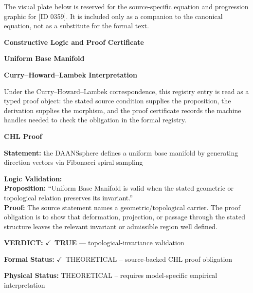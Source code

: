 \begingroup\footnotesize\sloppy
The visual plate below is reserved for the source-specific equation and progression graphic for [ID 0359]. It is included only as a companion to the canonical equation, not as a substitute for the formal text.
\par\endgroup
\ifTZPDarkEdition
{}
\fi

\clearpage
\begingroup\tzpsupportsetup
\noindent\textbf{\fontsize{10.8pt}{12.8pt}\selectfont [ID 0359] Constructive Logic and Proof Certificate}\par
\noindent\textbf{\fontsize{10pt}{12pt}\selectfont Uniform Base Manifold}\par
\vspace{0.45em}
\begingroup
\footnotesize
\setlength{\parskip}{0.22em}
\setlength{\parindent}{0pt}
\noindent\textbf{Curry--Howard--Lambek Interpretation}\par
Under the Curry--Howard--Lambek correspondence, this registry entry is read as a typed proof
object: the stated source condition supplies the proposition, the derivation supplies the
morphism, and the proof certificate records the machine handles needed to check the obligation
in the formal registry.

\vspace{0.45em}
\noindent\textbf{CHL Proof}\par
\textbf{Statement:} the DAANSsphere defines a uniform base manifold by generating direction vectors via
Fibonacci spiral sampling

\textbf{Logic Validation:}\\
\textbf{Proposition:} ``Uniform Base Manifold is valid when the stated geometric or topological relation
preserves its invariant.''\\
\textbf{Proof:} The source statement names a geometric/topological carrier. The proof obligation is to
show that deformation, projection, or passage through the stated structure leaves the
relevant invariant or admissible region well defined.

\textbf{VERDICT:} \ensuremath{\checkmark}\ \textbf{TRUE} --- topological-invariance validation

\textbf{Formal Status:} \ensuremath{\checkmark}\ THEORETICAL -- source-backed CHL proof obligation

\textbf{Physical Status:} THEORETICAL -- requires model-specific empirical interpretation
\par\vspace{0.45em}
\par
\ifTZPDarkEdition
{}
\fi
\endgroup
\endgroup
